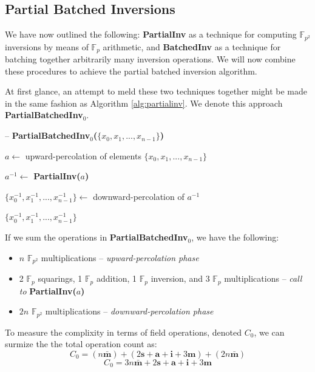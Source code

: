 \subsection{Partial Batched Inversions}

We have now outlined the following: \textbf{PartialInv} as a technique for computing $\mathbb{F}_{p^2}$ inversions by means of $\mathbb{F}_{p}$ arithmetic, and \textbf{BatchedInv} as a technique for batching together arbitrarily many inversion operations. We will now combine these procedures to achieve the partial batched inversion algorithm.

At first glance, an attempt to meld these two techniques together might be made in the same fashion as Algorithm \ref{alg:partialinv}. We denote this approach \textbf{PartialBatchedInv}$_0$.

\begin{algorithm}
\caption{-- \textbf{PartialBatchedInv$_0$($\{x_0, x_1, ... , x_{n-1}\}$)}}\label{alg:partialinv}
\begin{algorithmic}[1]
\State $a \gets$ upward-percolation of elements $\{x_0, x_1, ... , x_{n-1}\}$

\State $a^{-1} \gets$ \textbf{PartialInv($a$)}

\State $\{x_{0}^{-1}, x_{1}^{-1}, ... , x_{n-1}^{-1}\} \gets$ downward-percolation of $a^{-1}$

\State \Return $\{x_{0}^{-1}, x_{1}^{-1}, ... , x_{n-1}^{-1}\}$
\end{algorithmic}
\end{algorithm}
\noindent
If we sum the operations in \textbf{PartialBatchedInv}$_0$, we have the following: 
\begin{itemize}
\item $n$ $\mathbb{F}_{p^2}$ multiplications -- \emph{upward-percolation phase}
\item 2 $\mathbb{F}_{p}$ squarings, 1 $\mathbb{F}_{p}$ addition, 1 $\mathbb{F}_{p}$ inversion, and 3 $\mathbb{F}_{p}$ multiplications -- \emph{call to} \textbf{PartialInv($a$)}
\item $2n$ $\mathbb{F}_{p^2}$ multiplications -- \emph{downward-percolation phase}
\end{itemize}
To measure the complixity in terms of field operations, denoted $C_0$, we can surmize the the total operation count as:
$$
C_0 = (n\bar{\textbf{m}}) + (2\textbf{s} + \textbf{a} + \textbf{i} + 3\textbf{m}) + (2n\bar{\textbf{m}})
$$
$$
C_0 = 3n\bar{\textbf{m}} + 2\textbf{s} + \textbf{a} + \textbf{i} + 3\textbf{m}
$$

